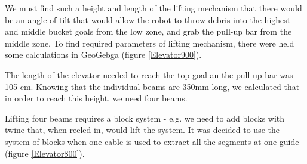 \begin{enumerate*}
  We must find such a height and length of the lifting mechanism that there would be an angle of tilt that would allow the robot to throw debris into the highest and middle bucket goals from the low zone, and grab the pull-up bar from the middle zone. To find required parameters of lifting mechanism, there were held some calculations in GeoGebga (figure \ref{Elevator900}).
  
  The length of the elevator needed to reach the top goal an the pull-up bar was 105 cm. Knowing that the individual beams are 350mm long, we calculated that in order to reach this height, we need four beams.  
  
  Lifting four beams requires a block system - e.g. we need to add blocks with twine that, when reeled in, would lift the system. It was decided to use the system of blocks when one cable is used to extract all the segments at one guide (figure \ref{Elevator800}).
  

\end{enumerate*}
